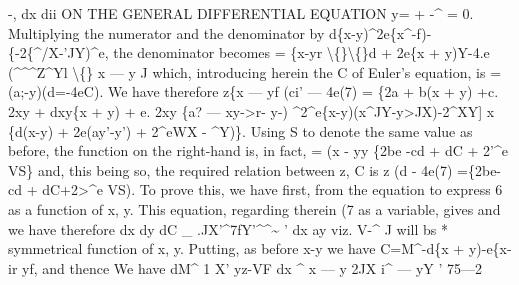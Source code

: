 \documentclass[11pt,a4paper]{book}
\begin{document}
-,
dx
dii
ON THE GENERAL DIFFERENTIAL EQUATION y= + -\textasciicircum{} = 0.
Multiplying the numerator and the denominator by
d\{x-y)\textasciicircum{}2e\{x\textasciicircum{}-f)-\{-2\{\textasciicircum{}/X-'JY)\textasciicircum{}e,
the denominator becomes
= \{x-yr \textbackslash\{\}\textbackslash\{\}d + 2e\{x + y)Y-4.e (\textasciicircum{}\textasciicircum{}\textasciicircum{}Z\textasciicircum{}Yl
\textbackslash\{\}
x --- y
J
which, introducing herein the C of Euler's
equation,
is
= (a;-y)\guillemotright{}(d=-4eC).
We have therefore
z\{x --- yf (ci' --- 4e(7) = \{2a + b(x + y) +c. 2xy + dxy\{x + y) + e. 2xy \{a? --- xy->r- y-)
\textasciicircum{}2\textasciicircum{}e\{x-y)(x\textasciicircum{}JY-y>JX)-2\textasciicircum{}XY] x \{d(x-y) + 2e(ay'-y') + 2\textasciicircum{}eWX - \textasciicircum{}Y)\}.
Using S
to denote
the
same value as
before,
the
function
on
the
right-hand
is,
in
fact,
= (x - yy \{2be -cd + dC + 2'\textasciicircum{}e VS\}
and,
this being
so, the
required relation between
z, C
is
z (d\guillemotright{} - 4e(7) =\{2be-cd + dC+2>\textasciicircum{}e VS).
To prove
this, we have
first, from the equation
to
express
6
as
a
function
of
x,
y.
This equation, regarding
therein
(7 as
a
variable,
gives
and we have therefore
dx
dy
dC \_
.JX'\textasciicircum{}7fY'\textasciicircum{}\textasciicircum{}\textasciitilde{}
'
dx
ay
viz. V-\textasciicircum{} J
will bs * symmetrical function
of x,
y.
Putting, as before
x-y
we have
C=M\textasciicircum{}-d\{x + y)-e\{x-ir yf,
and thence
We have
dM\textasciicircum{}
1
X'
yz-VF
dx \textasciicircum{} x --- y 2\guillemotright{}JX
i\textasciicircum{} --- yY
'
75---2
\end{document}
